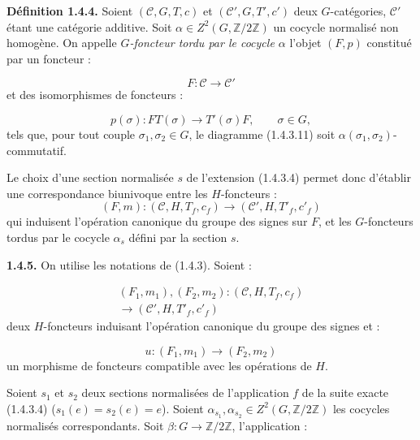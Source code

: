%
\noindent\textbf{Définition 1.4.4.}\quad
Soient $(\mathcal C,G,T,c)$ et $(\mathcal C',G,T',c')$ deux
$G$-catégories, $\mathcal C'$ étant une catégorie additive. Soit
$\alpha\in Z^2(G,\mathbb Z/2\mathbb Z)$ un cocycle normalisé non
homogène. On appelle \emph{$G$-foncteur tordu par le cocycle $\alpha$}
l'objet $(F,p)$ constitué par un foncteur :

\[
  F\colon\mathcal C\longrightarrow\mathcal C'
\]
et des isomorphismes de foncteurs :

\[
  p(\sigma)\colon FT(\sigma)\longrightarrow T'(\sigma)F,
  \qquad \sigma\in G,
\]
tels que, pour tout couple $\sigma_1,\sigma_2\in G$, le diagramme
(1.4.3.11) soit $\alpha(\sigma_1,\sigma_2)$-commutatif.

Le choix d'une section normalisée $s$ de l'extension (1.4.3.4) permet
donc d'établir une correspondance biunivoque entre les $H$-foncteurs :
\[
  (F,m)\colon(\mathcal C,H,T_f,c_f)
  \longrightarrow(\mathcal C',H,T'_f,c'_f)
\]
qui induisent l'opération canonique du groupe des signes sur $F$, et
les $G$-foncteurs tordus par le cocycle $\alpha_s$ défini par la
section $s$.

\noindent\textbf{1.4.5.}\quad
On utilise les notations de (1.4.3). Soient :

\begin{equation}
  \begin{gathered}
    (F_1,m_1),(F_2,m_2)\colon
    (\mathcal C,H,T_f,c_f)\\[-0.2em]
    \longrightarrow(\mathcal C',H,T'_f,c'_f)
  \end{gathered}
  \tag{1.4.5.1}
\end{equation}
deux $H$-foncteurs induisant l'opération canonique du groupe des
signes et :

\begin{equation}
  u\colon(F_1,m_1)\longrightarrow(F_2,m_2)
  \tag{1.4.5.2}
\end{equation}
un morphisme de foncteurs compatible avec les opérations de $H$.

Soient $s_1$ et $s_2$ deux sections normalisées de l'application $f$
de la suite exacte (1.4.3.4) ($s_1(e)=s_2(e)=e$). Soient
$\alpha_{s_1},\alpha_{s_2}\in Z^2(G,\mathbb Z/2\mathbb Z)$ les
cocycles normalisés correspondants. Soit
$\beta\colon G\to\mathbb Z/2\mathbb Z$, l'application :

